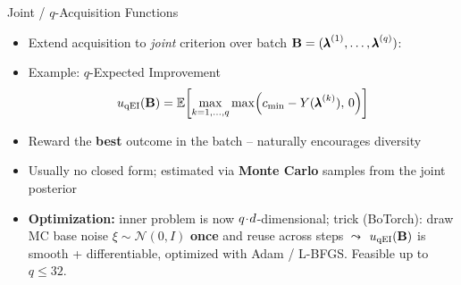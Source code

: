 \documentclass[main]{subfiles}
\begin{document}
\begin{frame}[t]{Joint / $q$-Acquisition Functions}
  \small
  \begin{itemize}
    \item Extend acquisition to \emph{joint} criterion over batch $\mathbf{B} = ({\pmb{\lambda}}^{(1)}, \ldots, {\pmb{\lambda}}^{(q)})$:
    \item Example: $q$-Expected Improvement~
        $$u_{\text{qEI}}(\mathbf{B}) = \operatorname*{\mathbb{E}}\!\left[\max_{k=1,\ldots,q} \max\!\left(c_{\min} - Y({\pmb{\lambda}}^{(k)}),\,0\right)\right]$$
    \item Reward the \textbf{best} outcome in the batch -- naturally encourages diversity
    \item Usually no closed form; estimated via \textbf{Monte Carlo} samples from the joint posterior
    \item \textbf{Optimization:} inner problem is now $q\!\cdot\!d$-dimensional;
    trick (BoTorch): draw MC base noise $\xi\!\sim\!\mathcal{N}(0,I)$ \textbf{once} and reuse across steps
    $\leadsto$ $u_{\text{qEI}}(\mathbf{B})$ is smooth + differentiable, optimized with Adam / L-BFGS.
    Feasible up to $q\!\le\!32$.
  \end{itemize}
\end{frame}
\end{document}
